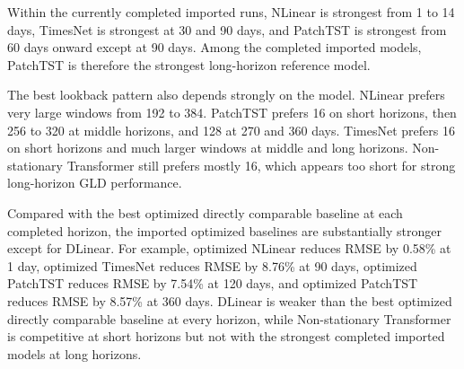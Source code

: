 Within the currently completed imported runs, NLinear is strongest from 1 to 14 days, TimesNet is strongest at 30 and 90 days, and PatchTST is strongest from 60 days onward except at 90 days.
Among the completed imported models, PatchTST is therefore the strongest long-horizon reference model.

The best lookback pattern also depends strongly on the model.
NLinear prefers very large windows from 192 to 384.
PatchTST prefers 16 on short horizons, then 256 to 320 at middle horizons, and 128 at 270 and 360 days.
TimesNet prefers 16 on short horizons and much larger windows at middle and long horizons.
Non-stationary Transformer still prefers mostly 16, which appears too short for strong long-horizon GLD performance.

Compared with the best optimized directly comparable baseline at each completed horizon, the imported optimized baselines are substantially stronger except for DLinear.
For example, optimized NLinear reduces RMSE by 0.58\% at 1 day, optimized TimesNet reduces RMSE by 8.76\% at 90 days, optimized PatchTST reduces RMSE by 7.54\% at 120 days, and optimized PatchTST reduces RMSE by 8.57\% at 360 days.
DLinear is weaker than the best optimized directly comparable baseline at every horizon, while Non-stationary Transformer is competitive at short horizons but not with the strongest completed imported models at long horizons.

